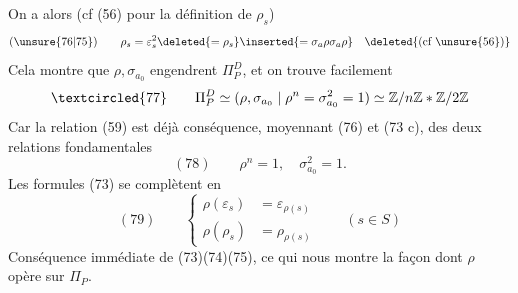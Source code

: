 On a alors (cf (56) pour la définition de $\rho_s$)
\[
(\unsure{76|75})\qquad
\rho_s=\varepsilon_s^2\deleted{=\rho_s}\inserted{=\sigma_a\rho\sigma_a\rho}
\quad\deleted{(\text{cf }\unsure{56})}
\]
Cela  montre que $\rho,\sigma_{a_0}$ engendrent $\Pi_P^D$, et on trouve facilement
\[
\textcircled{77}\qquad
\Pi_P^D\simeq(\rho,\sigma_{a_0}\mid\rho^n=\sigma_{a_0}^2=1)
\simeq\mathbb Z/n\mathbb Z*\mathbb Z/2\mathbb Z
\]
Car la relation (59) est déjà conséquence, moyennant (76) et (73 c), des deux relations fondamentales
\[
(78)\qquad \rho^n=1,\quad\sigma_{a_0}^2=1.
\]
Les formules (73) se complètent en
\[
(79)\qquad
\left\{
\begin{aligned}
\rho(\varepsilon_s)&=\varepsilon_{\rho(s)}\\
\rho(\rho_s)&=\rho_{\rho(s)}
\end{aligned}
\right.
\qquad(s\in S)
\]
Conséquence immédiate de (73)(74)(75), ce qui nous montre la façon dont $\rho$ opère sur $\Pi_P$.

